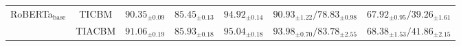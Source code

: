 \begin{table*}[t]
{\begin{tabular}{|c|c|c|c|c|c|c|}
    \multirow{2}{*}{RoBERTa$_{\text{base}}$}& TICBM & $90.35_{\pm0.09}$ & $85.45_{\pm0.13}$ & $94.92_{\pm0.14}$& $90.93_{\pm1.22} / 78.83_{\pm0.98}$ &  $67.92_{\pm0.95} / 39.26_{\pm1.61}$ \\
    & TIACBM & $\mathbf{91.06}_{\pm0.19}$ & $\mathbf{85.93}_{\pm0.18}$& $\mathbf{95.04}_{\pm 0.18}$&$\mathbf{93.98}_{\pm0.70}/\mathbf{83.78}_{\pm2.55}$ & $\mathbf{68.38}_{\pm1.53}/\mathbf{41.86}_{\pm2.15}$\\

\end{tabular}}
\end{table*}
